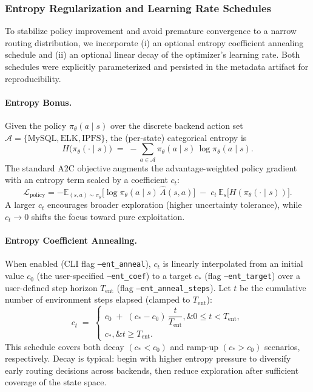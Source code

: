 \subsubsection{Entropy Regularization and Learning Rate Schedules}

To stabilize policy improvement and avoid premature convergence to a narrow routing distribution, we incorporate (i) an optional entropy coefficient annealing schedule and (ii) an optional linear decay of the optimizer’s learning rate. Both schedules were explicitly parameterized and persisted in the metadata artifact for reproducibility.

\paragraph{Entropy Bonus.}
Given the policy $\pi_\theta(a \mid s)$ over the discrete backend action set $\mathcal{A} = \{\text{MySQL}, \text{ELK}, \text{IPFS}\}$, the (per-state) categorical entropy is
\[
H\big(\pi_\theta(\cdot \mid s)\big) \;=\; - \sum_{a \in \mathcal{A}} \pi_\theta(a \mid s)\,\log \pi_\theta(a \mid s).
\]
The standard A2C objective augments the advantage-weighted policy gradient with an entropy term scaled by a coefficient $c_t$:
\[
\mathcal{L}_{\text{policy}} = - \mathbb{E}_{(s,a)\sim \pi_\theta}\big[ \log \pi_\theta(a \mid s)\, \hat{A}(s,a) \big] \;-\; c_t \, \mathbb{E}_{s}\big[ H(\pi_\theta(\cdot \mid s)) \big].
\]
A larger $c_t$ encourages broader exploration (higher uncertainty tolerance), while $c_t \to 0$ shifts the focus toward pure exploitation.

\paragraph{Entropy Coefficient Annealing.}
When enabled (CLI flag \texttt{--ent\_anneal}), $c_t$ is linearly interpolated from an initial value $c_0$ (the user-specified \texttt{--ent\_coef}) to a target $c_\ast$ (flag \texttt{--ent\_target}) over a user-defined step horizon $T_{\text{ent}}$ (flag \texttt{--ent\_anneal\_steps}). Let $t$ be the cumulative number of environment steps elapsed (clamped to $T_{\text{ent}}$):
\[
c_t \;=\; 
\begin{cases}
c_0 \;+\; (c_\ast - c_0)\,\dfrac{t}{T_{\text{ent}}},\& 0 \le t < T_{\text{ent}},\\[6pt]
c_\ast,\& t \ge T_{\text{ent}}.
\end{cases}
\]
This schedule covers both decay $(c_\ast < c_0)$ and ramp-up $(c_\ast > c_0)$ scenarios, respectively. Decay is typical: begin with higher entropy pressure to diversify early routing decisions across backends, then reduce exploration after sufficient coverage of the state space.

